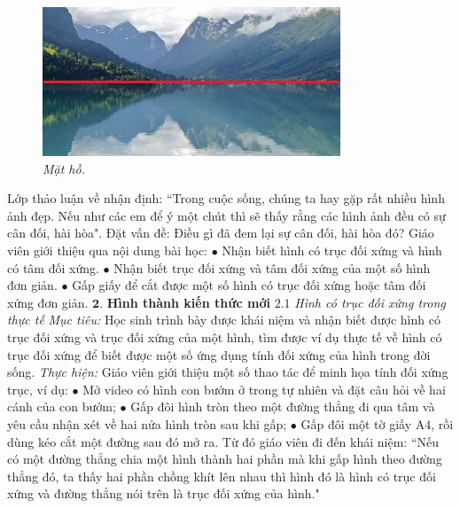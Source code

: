 \begin{multicols}{2}
\begin{figure}[H]
		\vspace*{2pt}
		\includegraphics[width= 1\linewidth]{3}
		\caption{\small\textit{\color{diendantoanhoc}Mặt hồ.}}
		\vspace*{-10pt}
	\end{figure}
	Lớp thảo luận về nhận định:  ``Trong cuộc sống, chúng ta hay gặp rất nhiều hình ảnh đẹp. Nếu như các em để ý một chút thì sẽ thấy rằng các hình ảnh đều có sự cân đối, hài hòa". 
	\vskip 0.1cm
	Đặt vấn đề: Điều gì đã đem lại sự cân đối, hài hòa đó?
	\vskip 0.1cm
	Giáo viên giới thiệu qua nội dung bài học:
	\vskip 0.1cm
	$\bullet$	Nhận biết hình có trục đối xứng và hình có tâm đối xứng.
	\vskip 0.1cm
	$\bullet$	Nhận biết trục đối xứng và tâm đối xứng của một số hình đơn giản.
	\vskip 0.1cm
	$\bullet$	Gấp giấy để cắt được một số hình có trục đối xứng hoặc tâm đối xứng đơn giản.
	\vskip 0.1cm
	$\pmb{2.}$ \textbf{\color{diendantoanhoc}Hình thành kiến thức mới}
	\vskip 0.1cm
	${2.1}$ \textit{Hình có trục đối xứng trong thực tế}
	\vskip 0.1cm
	\textit{Mục tiêu:} Học sinh trình bày được khái niệm và nhận biết được hình có trục đối xứng và trục đối xứng của một hình, tìm được ví dụ thực tế về hình có trục đối xứng để biết được một số ứng dụng tính đối xứng của hình trong đời sống.
	\vskip 0.1cm
	\textit{Thực hiện:} Giáo viên giới thiệu một số thao tác để minh họa tính đối xứng trục, ví dụ:
	\vskip 0.1cm
	$\bullet$   Mở video có hình con bướm ở trong tự nhiên và đặt câu hỏi về hai cánh của con bướm; 
	\vskip 0.1cm
	$\bullet$	Gấp đôi hình tròn theo một đường thẳng đi qua tâm và yêu cầu nhận xét về hai nửa hình tròn sau khi gấp;
	\vskip 0.1cm
	$\bullet$	Gấp đôi một tờ giấy A$4$, rồi dùng kéo cắt một đường sau đó mở ra.
	Từ đó giáo viên đi đến khái niệm: ``Nếu có một đường thẳng chia một hình thành hai phần mà khi gấp hình theo đường thẳng đó, ta thấy hai phần chồng khít lên nhau thì hình đó là hình có trục đối xứng và đường thẳng nói trên là trục đối xứng của hình."

\end{multicols}

